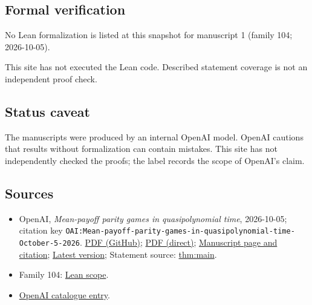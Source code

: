 \documentclass[11pt]{article}
\begin{document}
\subsection{Formal verification}
No Lean formalization is listed at this snapshot for manuscript 1 (family 104; 2026-10-05).

This site has not executed the Lean code. Described statement coverage is not an independent proof check.

\subsection{Status caveat}
The manuscripts were produced by an internal OpenAI model. OpenAI cautions that results without formalization can contain mistakes. This site has not independently checked the proofs; the label records the scope of OpenAI's claim.

\subsection{Sources}
\begin{itemize}
\item OpenAI, \emph{Mean-payoff parity games in quasipolynomial time}, 2026-10-05; citation key \texttt{OAI:Mean-payoff-parity-games-in-quasipolynomial-time-October-5-2026}. \href{https://github.com/openai/math/blob/adc7f1241b42e322a6451854ab7e4b4c146bf78a/preprints/Mean-payoff-parity-games-in-quasipolynomial-time-October-5-2026/mean-payoff-parity.pdf}{PDF (GitHub)}; \href{https://github.com/openai/math/raw/adc7f1241b42e322a6451854ab7e4b4c146bf78a/preprints/Mean-payoff-parity-games-in-quasipolynomial-time-October-5-2026/mean-payoff-parity.pdf}{PDF (direct)}; \href{https://github.com/openai/math/blob/adc7f1241b42e322a6451854ab7e4b4c146bf78a/preprints/Mean-payoff-parity-games-in-quasipolynomial-time-October-5-2026/README.md}{Manuscript page and citation}; \href{https://github.com/openai/math/blob/main/preprints/Mean-payoff-parity-games-in-quasipolynomial-time-October-5-2026/mean-payoff-parity.pdf}{Latest version}; Statement source: \href{https://github.com/openai/math/blob/adc7f1241b42e322a6451854ab7e4b4c146bf78a/preprints/Mean-payoff-parity-games-in-quasipolynomial-time-October-5-2026/build/sections/01-introduction.tex\#L33}{thm:main}.
\item Family 104: \href{https://github.com/openai/math/blob/adc7f1241b42e322a6451854ab7e4b4c146bf78a/lean/docs/104.md}{Lean scope}.
\item \href{https://github.com/openai/math/blob/adc7f1241b42e322a6451854ab7e4b4c146bf78a/CONTENTS.md}{OpenAI catalogue entry}.
\end{itemize}
\end{document}
